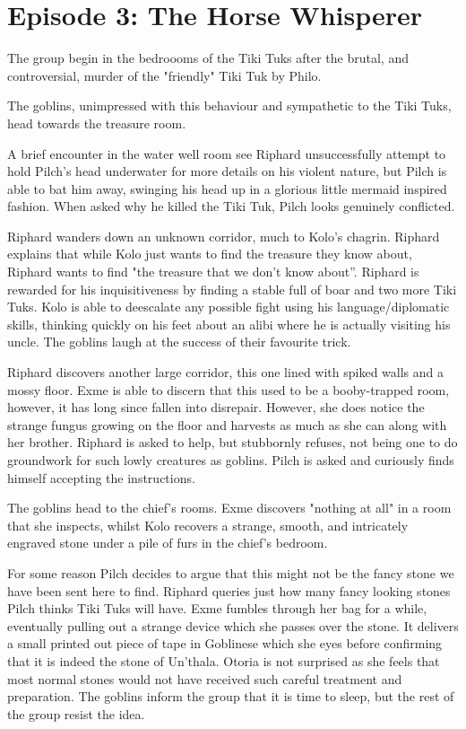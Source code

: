 \section{Episode 3: The Horse Whisperer}

The group begin in the bedroooms of the Tiki Tuks after the brutal, and controversial, murder of the "friendly" Tiki Tuk by Philo.

The goblins, unimpressed with this behaviour and sympathetic to the Tiki Tuks, head towards the treasure room.

A brief encounter in the water well room see Riphard unsuccessfully attempt to hold Pilch’s head underwater for more details on his violent nature, but Pilch is able to bat him away, swinging his head up in a glorious little mermaid inspired fashion. When asked why he killed the Tiki Tuk, Pilch looks genuinely conflicted.

Riphard wanders down an unknown corridor, much to Kolo's chagrin. Riphard explains that while Kolo just wants to find the treasure they know about, Riphard wants to find "the treasure that we don't know about”. Riphard is rewarded for his inquisitiveness by finding a stable full of boar and two more Tiki Tuks. Kolo is able to deescalate any possible fight using his language/diplomatic skills, thinking quickly on his feet about an alibi where he is actually visiting his uncle. The goblins laugh at the success of their favourite trick.

Riphard discovers another large corridor, this one lined with spiked walls and a mossy floor. Exme is able to discern that this used to be a booby-trapped room, however, it has long since fallen into disrepair. However, she does notice the strange fungus growing on the floor and harvests as much as she can along with her brother. Riphard is asked to help, but stubbornly refuses, not being one to do groundwork for such lowly creatures as goblins. Pilch is asked and curiously finds himself accepting the instructions.

The goblins head to the chief’s rooms. Exme discovers "nothing at all" in a room that she inspects, whilst Kolo recovers a strange, smooth, and intricately engraved stone under a pile of furs in the chief’s bedroom.

For some reason Pilch decides to argue that this might not be the fancy stone we have been sent here to find. Riphard queries just how many fancy looking stones Pilch thinks Tiki Tuks will have. Exme fumbles through her bag for a while, eventually pulling out a strange device which she passes over the stone. It delivers a small printed out piece of tape in Goblinese which she eyes before confirming that it is indeed the stone of Un’thala. Otoria is not surprised as she feels that most normal stones would not have received such careful treatment and preparation. The goblins inform the group that it is time to sleep, but the rest of the group resist the idea.

